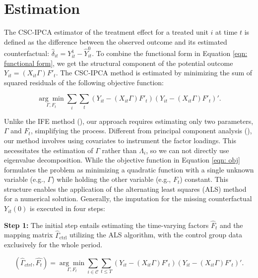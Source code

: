 \documentclass[12pt]{article}
\begin{document}
\section{Estimation}
\label{sec: estimation}
The CSC-IPCA estimator of the treatment effect for a treated unit $i$ at time $t$ is defined as the difference between the observed outcome and its estimated counterfactual: $\hat{\delta}_{it} = Y_{it}^1 - \hat{Y}_{it}^0$. To combine the functional form in Equation \ref{eqn: functional form}, we get the structural component of the potential outcome $Y_{it} = (X_{it}\Gamma) F'_{t}$. The CSC-IPCA method is estimated by minimizing the sum of squared residuals of the following objective function:

\begin{equation}
\label{eqn: obj}
\underset{\Gamma, F_t}{\arg\min} \sum_{i} \sum_{t}\left( Y_{it} - (X_{it}\Gamma) F'_{t} \right)\left( Y_{it} - (X_{it}\Gamma) F'_{t} \right)'.
\end{equation}

Unlike the IFE method (\cite{bai2009panel,xu2017generalized}), our approach requires estimating only two parameters, $\Gamma$ and $F_t$, simplifying the process. Different from principal component analysis (\cite{jolliffe2002principal,stock2002forecasting}), our method involves using covariates to instrument the factor loadings. This necessitates the estimation of $\Gamma$ rather than $\Lambda_i$, so we can not directly use eigenvalue decomposition. While the objective function in Equation \ref{eqn: obj} formulates the problem as minimizing a quadratic function with a single unknown variable (e.g., $\Gamma$) while holding the other variable (e.g., $F_t$) constant. This structure enables the application of the alternating least squares (ALS) method for a numerical solution. Generally, the imputation for the missing counterfactual $Y_{it}(0)$ is executed in four steps:

\textbf{Step 1:} The initial step entails estimating the time-varying factors $\hat{F}_t$ and the mapping matrix $\hat{\Gamma}_{\text{ctrl}}$ utilizing the ALS algorithm, with the control group data exclusively for the whole period.

\begin{equation}
(\hat{\Gamma}_{ctrl}, \hat{F_t}) = \underset{\Gamma, F_t}{\arg\min} \sum_{i \in \mathcal{C}} \sum_{t \leq T}\left( Y_{it} - (X_{it}\Gamma) F'_{t} \right)\left( Y_{it} - (X_{it}\Gamma) F'_{t} \right)'.
\label{eq: optimization}
\end{equation}
\end{document}
